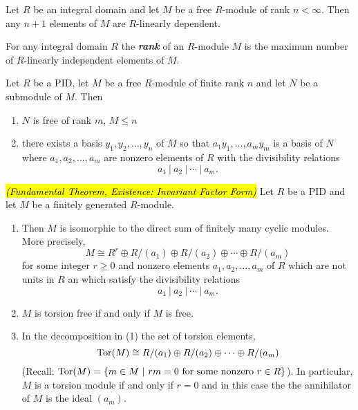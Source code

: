 \nl

\begin{prop}
Let $R$ be an integral domain and let $M$ be a free $R$-module of rank $n<\infty$. Then any $n + 1$ elements of $M$ are $R$-linearly dependent.
\end{prop}

\nl

\begin{defn}
For any integral domain $R$ the \textit{\textbf{rank}} of an $R$-module $M$ is the maximum number of $R$-linearly independent elements of $M$.
\end{defn}

\nl

\begin{thm}
Let $R$ be a PID, let $M$ be a free $R$-module of finite rank $n$ and let $N$ be a submodule of $M$. Then
\begin{enumerate}
\item $N$ is free of rank $m$, $M\leq n$
\item there exists a basis $y_1,y_2,\ldots,y_n$ of $M$ so that $a_1y_1,\ldots,a_my_m$ is a basis of $N$ where $a_1, a_2, \ldots, a_m$ are nonzero elements of $R$ with the divisibility relations
\[a_1\ |\ a_2\ |\ \cdots\ |\ a_m.\]
\end{enumerate}
\end{thm}

\nl

\begin{thm}\textit{\hl{(Fundamental Theorem, Existence: Invariant Factor Form)}}
Let $R$ be a PID and let $M$ be a finitely generated $R$-module.
\begin{enumerate}
\item Then $M$ is isomorphic to the direct sum of finitely many cyclic modules. More precisely,
\[M\cong R^r\oplus R/(a_1) \oplus R/(a_2) \oplus \cdots \oplus R/(a_m)\]
for some integer $r\geq 0$ and nonzero elements $a_1, a_2,\ldots, a_m$ of $R$ which are not units in $R$ an which satisfy the divisibility relations 
\[a_1\ |\ a_2\ |\ \cdots\ |\ a_m.\]

\item $M$ is torsion free if and only if $M$ is free.
\item In the decomposition in (1) the set of torsion elements,
\[\text{Tor}(M) \cong R/(a_1) \oplus R/(a_2) \oplus \cdots \oplus R/(a_m)\]
(Recall: $\text{Tor}(M) = \{m\in M\ |\ rm = 0\text{ for some nonzero }r\in R\}$). In particular, $M$ is a torsion module if and only if $r = 0$ and in this case the the annihilator of $M$ is the ideal $(a_m)$.
\end{enumerate}
\end{thm}

